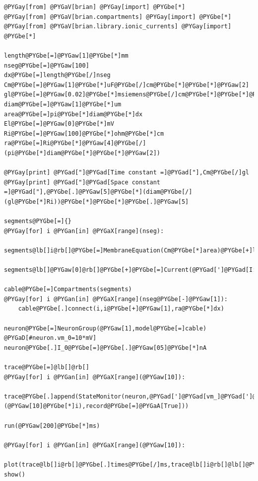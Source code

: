\documentclass[letterpaper,10pt]{manual}
\begin{document}
\begin{Verbatim}[commandchars=@\[\]]
@PYGay[from] @PYGaV[brian] @PYGay[import] @PYGbe[*]
@PYGay[from] @PYGaV[brian.compartments] @PYGay[import] @PYGbe[*]
@PYGay[from] @PYGaV[brian.library.ionic_currents] @PYGay[import] @PYGbe[*]

length@PYGbe[=]@PYGaw[1]@PYGbe[*]mm
nseg@PYGbe[=]@PYGaw[100]
dx@PYGbe[=]length@PYGbe[/]nseg
Cm@PYGbe[=]@PYGaw[1]@PYGbe[*]uF@PYGbe[/]cm@PYGbe[*]@PYGbe[*]@PYGaw[2]
gl@PYGbe[=]@PYGaw[0.02]@PYGbe[*]msiemens@PYGbe[/]cm@PYGbe[*]@PYGbe[*]@PYGaw[2]
diam@PYGbe[=]@PYGaw[1]@PYGbe[*]um
area@PYGbe[=]pi@PYGbe[*]diam@PYGbe[*]dx
El@PYGbe[=]@PYGaw[0]@PYGbe[*]mV
Ri@PYGbe[=]@PYGaw[100]@PYGbe[*]ohm@PYGbe[*]cm
ra@PYGbe[=]Ri@PYGbe[*]@PYGaw[4]@PYGbe[/](pi@PYGbe[*]diam@PYGbe[*]@PYGbe[*]@PYGaw[2])

@PYGay[print] @PYGad["]@PYGad[Time constant =]@PYGad["],Cm@PYGbe[/]gl
@PYGay[print] @PYGad["]@PYGad[Space constant =]@PYGad["],@PYGbe[.]@PYGaw[5]@PYGbe[*](diam@PYGbe[/](gl@PYGbe[*]Ri))@PYGbe[*]@PYGbe[*]@PYGbe[.]@PYGaw[5]

segments@PYGbe[=]{}
@PYGay[for] i @PYGan[in] @PYGaX[range](nseg):
    segments@lb[]i@rb[]@PYGbe[=]MembraneEquation(Cm@PYGbe[*]area)@PYGbe[+]leak_current(gl@PYGbe[*]area,El)

segments@lb[]@PYGaw[0]@rb[]@PYGbe[+]@PYGbe[=]Current(@PYGad[']@PYGad[I:nA]@PYGad['])

cable@PYGbe[=]Compartments(segments)
@PYGay[for] i @PYGan[in] @PYGaX[range](nseg@PYGbe[-]@PYGaw[1]):
    cable@PYGbe[.]connect(i,i@PYGbe[+]@PYGaw[1],ra@PYGbe[*]dx)

neuron@PYGbe[=]NeuronGroup(@PYGaw[1],model@PYGbe[=]cable)
@PYGaD[#neuron.vm_0=10*mV]
neuron@PYGbe[.]I_0@PYGbe[=]@PYGbe[.]@PYGaw[05]@PYGbe[*]nA

trace@PYGbe[=]@lb[]@rb[]
@PYGay[for] i @PYGan[in] @PYGaX[range](@PYGaw[10]):
    trace@PYGbe[.]append(StateMonitor(neuron,@PYGad[']@PYGad[vm_]@PYGad[']@PYGbe[+]@PYGaX[str](@PYGaw[10]@PYGbe[*]i),record@PYGbe[=]@PYGaA[True]))

run(@PYGaw[200]@PYGbe[*]ms)

@PYGay[for] i @PYGan[in] @PYGaX[range](@PYGaw[10]):
    plot(trace@lb[]i@rb[]@PYGbe[.]times@PYGbe[/]ms,trace@lb[]i@rb[]@lb[]@PYGaw[0]@rb[]@PYGbe[/]mV)
show()
\end{Verbatim}

\resetcurrentobjects
{}
\end{document}
